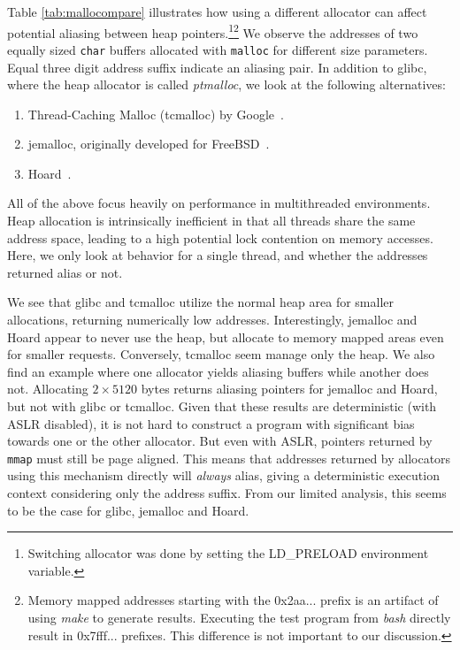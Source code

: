 \documentclass[10pt, conference, compsocconf]{IEEEtran}
\begin{document}
Table \ref{tab:mallocompare} illustrates how using a different allocator can affect potential aliasing between heap pointers.\footnote{Switching allocator was done by setting the LD\_PRELOAD environment variable.}\footnote{Memory mapped addresses starting with the 0x2aa... prefix is an artifact of using \emph{make} to generate results. Executing the test program from \emph{bash} directly result in 0x7fff... prefixes. This difference is not important to our discussion.}
We observe the addresses of two equally sized \texttt{char} buffers allocated with \texttt{malloc} for different size parameters.
Equal three digit address suffix indicate an aliasing pair.
In addition to glibc, where the heap allocator is called \emph{ptmalloc}, we look at the following alternatives:
\begin{enumerate}
  \item Thread-Caching Malloc (tcmalloc) by Google~\cite{TCMalloc}.
  \item jemalloc, originally developed for FreeBSD~\cite{JEMalloc}.
  \item Hoard~\cite{Berger:2000:Hoard}.
\end{enumerate}
All of the above focus heavily on performance in multithreaded environments.
Heap allocation is intrinsically inefficient in that all threads share the same address space, leading to a high potential lock contention on memory accesses.
Here, we only look at behavior for a single thread, and whether the addresses returned alias or not.

We see that glibc and tcmalloc utilize the normal heap area for smaller allocations, returning numerically low addresses. %
Interestingly, jemalloc and Hoard appear to never use the heap, but allocate to memory mapped areas even for smaller requests.
Conversely, tcmalloc seem manage only the heap.
We also find an example where one allocator yields aliasing buffers while another does not.
Allocating $2 \times 5120$ bytes returns aliasing pointers for jemalloc and Hoard, but not with glibc or tcmalloc.
Given that these results are deterministic (with ASLR disabled), it is not hard to construct a program with significant bias towards one or the other allocator.
But even with ASLR, pointers returned by \texttt{mmap} must still be page aligned.
This means that addresses returned by allocators using this mechanism directly will \emph{always} alias, giving a deterministic execution context considering only the address suffix.
From our limited analysis, this seems to be the case for glibc, jemalloc and Hoard.
\end{document}
